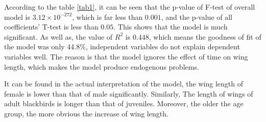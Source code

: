 
According to the table \ref{tab1}, it can be seen that the p-value of F-test of overall model is $3.12 \times 10^{-272}$, which is far less than $0.001$, and the p-value of all coefficients' T-test is less than $0.05$. This shows that the model is much significant. As well as, the value of $R^{2}$ is 0.448, which means the goodness of fit of the model was only 44.8\%, independent variables do not explain dependent variables well. The reason is that the model ignores the effect of time on wing length, which makes the model produce endogenous problems.

It can be found in the actual interpretation of the model, the wing length of female is lower than that of male significantly. Similarly, The length of wings of adult blackbirds is longer than that of juveniles. Moreover, the older the age group, the more obvious the increase of wing length.
